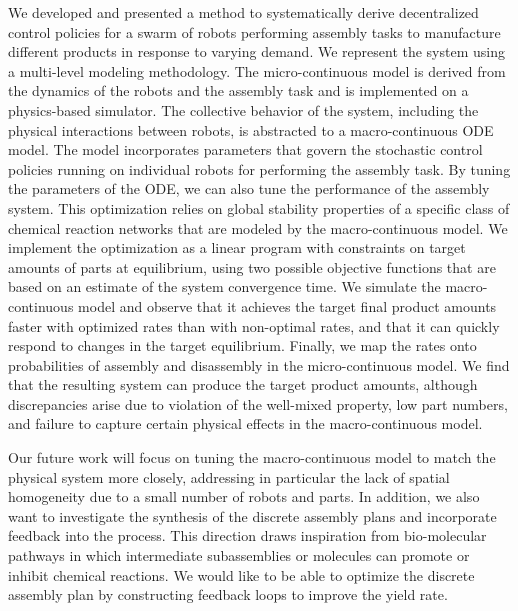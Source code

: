 We developed and presented a method to systematically derive
decentralized control policies for a swarm of robots performing
assembly tasks to manufacture different products in response to
varying demand. We represent the system using a multi-level modeling
methodology. The micro-continuous model is derived from the dynamics
of the robots and the assembly task and is implemented on a
physics-based simulator.  The collective behavior of the system,
including the physical interactions between robots, is abstracted to
a macro-continuous ODE model. The model incorporates parameters that
govern the stochastic control policies running on individual robots
for performing the assembly task. By tuning the parameters of the
ODE, we can also tune the performance of the assembly system. This
optimization relies on global stability properties of a specific
class of chemical reaction networks that are modeled by the
macro-continuous model. We implement the optimization as a linear
program with constraints on target amounts of parts at equilibrium,
using two possible objective functions that are based on an estimate
of the system convergence time.  We simulate the macro-continuous
model and observe that it achieves the target final product amounts
faster with optimized rates than with non-optimal rates, and that it
can quickly respond to changes in the target equilibrium.  Finally,
we map the rates onto probabilities of assembly and disassembly in
the micro-continuous model.  We find that the resulting system can
produce the target product amounts, although discrepancies arise due
to violation of the well-mixed property, low part numbers, and
failure to capture certain physical effects in the macro-continuous
model.

Our future work will focus on tuning the macro-continuous model to
match the physical system more closely, addressing in particular the
lack of spatial homogeneity due to a small number of robots and
parts. In addition, we also want to investigate the synthesis of the
discrete assembly plans and incorporate feedback into the process.
This direction draws inspiration from bio-molecular pathways in
which intermediate subassemblies or molecules can promote or inhibit
chemical reactions. We would like to be able to optimize the
discrete assembly plan by constructing feedback loops to improve the
yield rate.

